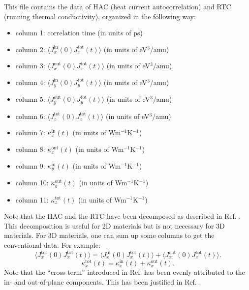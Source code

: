 \documentclass[12pt,a4paper]{report}
\begin{document}
This file contains the data of HAC (heat current autocorrelation) and RTC (running thermal conductivity), organized in the following way:
\begin{itemize}
\item column 1: correlation time (in units of ps)
\item column 2: $\langle J_x^{\text{in}}(0)J_x^{\text{tot}}(t)\rangle$ (in units of eV$^3$/amu)
\item column 3: $\langle J_x^{\text{out}}(0)J_x^{\text{tot}}(t)\rangle$ (in units of eV$^3$/amu)
\item column 4: $\langle J_y^{\text{in}}(0)J_y^{\text{tot}}(t)\rangle$ (in units of eV$^3$/amu)
\item column 5: $\langle J_y^{\text{out}}(0)J_y^{\text{tot}}(t)\rangle$ (in units of eV$^3$/amu)
\item column 6: $\langle J_z^{\text{tot}}(0)J_z^{\text{tot}}(t)\rangle$ (in units of eV$^3$/amu)
\item column 7: $\kappa_x^{\text{in}}(t)$ (in units of Wm$^{-1}$K$^{-1}$)
\item column 8: $\kappa_x^{\text{out}}(t)$ (in units of Wm$^{-1}$K$^{-1}$)
\item column 9: $\kappa_y^{\text{in}}(t)$ (in units of Wm$^{-1}$K$^{-1}$)
\item column 10: $\kappa_y^{\text{out}}(t)$ (in units of Wm$^{-1}$K$^{-1}$)
\item column 11: $\kappa_z^{\text{tot}}(t)$ (in units of Wm$^{-1}$K$^{-1}$)
\end{itemize}

Note that the HAC and the RTC have been decomposed as described in Ref. \cite{fan2017prb}. This decomposition is useful for 2D materials but is not necessary for 3D materials. For 3D materials, one can sum up some columns to get the conventional data. For example:
\begin{equation}
\langle J_x^{\text{tot}}(0)J_x^{\text{tot}}(t) \rangle =
\langle J_x^{\text{in}}(0)J_x^{\text{tot}}(t) \rangle +
\langle J_x^{\text{out}}(0)J_x^{\text{tot}}(t) \rangle.
\end{equation}
\begin{equation}
\kappa_x^{\text{tot}}(t) = \kappa_x^{\text{in}}(t) + \kappa_x^{\text{out}}(t).
\end{equation}
Note that the ``cross term'' introduced in Ref. \cite{fan2017prb} has been evenly attributed to the in- and out-of-plane components. This has been justified in Ref. \cite{fan2018submitted}.
\end{document}
